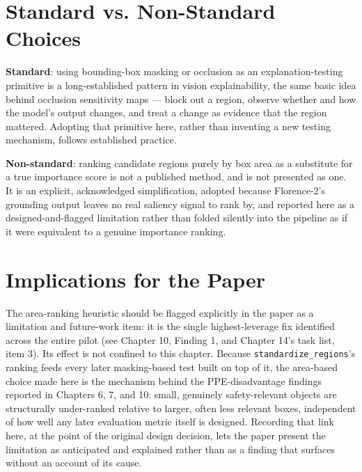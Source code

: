 \section{Standard vs. Non-Standard Choices}

\textbf{Standard}: using bounding-box masking or occlusion as an explanation-testing primitive is a
long-established pattern in vision explainability, the same basic idea behind occlusion sensitivity
maps --- block out a region, observe whether and how the model's output changes, and treat a change
as evidence that the region mattered. Adopting that primitive here, rather than inventing a new
testing mechanism, follows established practice.

\textbf{Non-standard}: ranking candidate regions purely by box area as a substitute for a true
importance score is not a published method, and is not presented as one. It is an explicit,
acknowledged simplification, adopted because Florence-2's grounding output leaves no real
saliency signal to rank by, and reported here as a designed-and-flagged limitation rather than
folded silently into the pipeline as if it were equivalent to a genuine importance ranking.

\section{Implications for the Paper}

The area-ranking heuristic should be flagged explicitly in the paper as a limitation and
future-work item: it is the single highest-leverage fix identified across the entire pilot (see
Chapter 10, Finding 1, and Chapter 14's task list, item 3). Its effect is not confined to this
chapter. Because \texttt{standardize\_regions}'s ranking feeds every later masking-based test built
on top of it, the area-based choice made here is the mechanism behind the PPE-disadvantage findings
reported in Chapters 6, 7, and 10: small, genuinely safety-relevant objects are structurally
under-ranked relative to larger, often less relevant boxes, independent of how well any later
evaluation metric itself is designed. Recording that link here, at the point of the original design
decision, lets the paper present the limitation as anticipated and explained rather than as a
finding that surfaces without an account of its cause.
